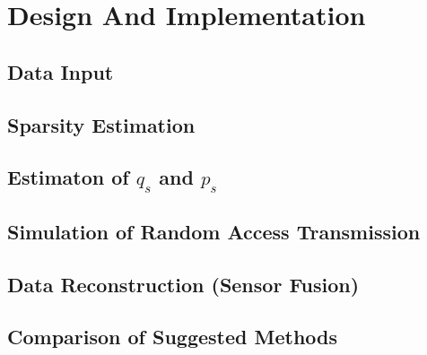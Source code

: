 \documentclass[Main]{subfiles}
\begin{document}
\section{Design And Implementation} %
\label{sec:design_and_implementation}

	\subsection{Data Input} %
	\label{sub:data_input}
	

	\subsection{Sparsity Estimation} %
	\label{sub:sparsity_estimation}
	

	\subsection{Estimaton of $q_s$ and $p_s$} %
	\label{sub:estimaton_of_q_s_and_p_s_}
	

	\subsection{Simulation of Random Access Transmission} %
	\label{sub:simulation_of_random_access_transmission}



	

	\subsection{Data Reconstruction (Sensor Fusion)} %
	\label{sub:data_reconstruction_}
	

	
	\subsection{Comparison of Suggested Methods} %
	\label{sub:comparison_of_suggested_methods}

	

\end{document}
